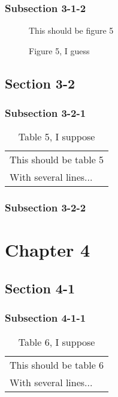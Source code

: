 \documentclass[10pt]{book}
\begin{document}
\subsection{Subsection 3-1-2}
\label{sec:subsection-3-1-2}

\begin{figure}
  \centering
  This should be figure 5
  \caption{Figure 5, I guess}
  \label{fig:figure-5}
\end{figure}


\section{Section 3-2}
\label{sec:section-3-2}

\subsection{Subsection 3-2-1}
\label{sec:subsection-3-2-1}

\begin{table}
  \centering
  \begin{tabular}{l}
    This should be table 5\\
    With several lines...
  \end{tabular}
  \caption{Table 5, I suppose}
  \label{tab:table-5}
\end{table}


\subsection{Subsection 3-2-2}
\label{sec:subsection-3-2-2}


\chapter{Chapter 4}
\label{cha:chapter-4}
\minitoc
\minilot
\minilof

\section{Section 4-1}
\label{sec:section-4-1}


\subsection{Subsection 4-1-1}
\label{sec:subsection-4-1-1}

\begin{table}
  \centering
  \begin{tabular}{l}
    This should be table 6\\
    With several lines...
  \end{tabular}
  \caption{Table 6, I suppose}
  \label{tab:table-6}
\end{table}
\end{document}
